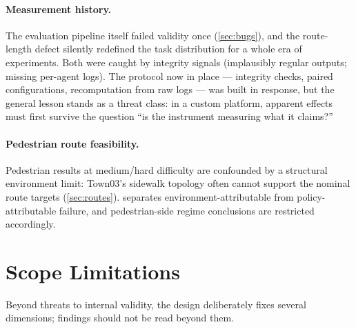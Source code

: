 \paragraph{Measurement history.}
The evaluation pipeline itself failed validity once
(\cref{sec:bugs}), and the route-length defect silently redefined the
task distribution for a whole era of experiments. Both were caught by
integrity signals (implausibly regular outputs; missing per-agent logs).
The protocol now in place --- integrity checks, paired configurations,
recomputation from raw logs --- was built in response, but the general
lesson stands as a threat class: in a custom platform, apparent effects
must first survive the question ``is the instrument measuring what it
claims?''

\paragraph{Pedestrian route feasibility.}
Pedestrian results at medium/hard difficulty are confounded by a
structural environment limit: Town03's sidewalk topology often cannot
support the nominal route targets (\cref{sec:routes}). 
separates environment-attributable from policy-attributable failure, and
pedestrian-side regime conclusions are restricted accordingly.

\section{Scope Limitations}
\label{sec:scope}

Beyond threats to internal validity, the design deliberately fixes
several dimensions; findings should not be read beyond them.

